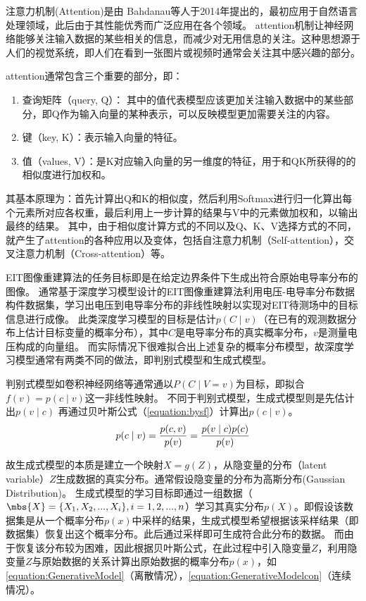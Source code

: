 注意力机制(Attention)是由 Bahdanau等人于2014年提出的\cite{2014Neural}，最初应用于自然语言处理领域，此后由于其性能优秀而广泛应用在各个领域。
attention机制让神经网络能够关注输入数据的某些相关的信息，而减少对无用信息的关注。这种思想源于人们的视觉系统，即人们在看到一张图片或视频时通常会关注其中感兴趣的部分。

attention通常包含三个重要的部分，即：
\begin{enumerate}
  \item 查询矩阵（query, Q）： 其中的值代表模型应该更加关注输入数据中的某些部分，即Q作为输入向量的某种表示，可以反映模型更加需要关注的内容。
  \item 键（key, K）：表示输入向量的特征。
  \item 值（values, V）：是K对应输入向量的另一维度的特征，用于和QK所获得的的相似度进行加权和。
\end{enumerate}

其基本原理为：首先计算出Q和K的相似度，然后利用Softmax进行归一化算出每个元素所对应各权重，最后利用上一步计算的结果与V中的元素做加权和，以输出最终的结果。
其中，由于相似度计算方式的不同以及Q、K、V选择方式的不同，就产生了attention的各种应用以及变体，包括自注意力机制（Self-attention），交叉注意力机制（Cross-attention）等。


EIT图像重建算法的任务目标即是在给定边界条件下生成出符合原始电导率分布的图像。
通常基于深度学习模型设计的EIT图像重建算法利用电压-电导率分布数据构件数据集，学习出电压到电导率分布的非线性映射以实现对EIT待测场中的目标信息进行成像。
此类深度学习模型的目标是估计$p(C \mid v)$（在已有的观测数据分布上估计目标变量的概率分布），其中$C$是电导率分布的真实概率分布，$v$是测量电压构成的向量组。
而实际情况下很难拟合出上述复杂的概率分布模型，故深度学习模型通常有两类不同的做法，即判别式模型和生成式模型。

判别式模型如卷积神经网络等通常通以$P(C \mid V=v)$为目标，即拟合$f(v) = p(c \mid v)$这一非线性映射。
不同于判别式模型，生成式模型则是先估计出$p(v \mid c)$ 再通过贝叶斯公式（\cref{equation:bysf}）计算出$p(c \mid v)$。
\begin{equation}
  \centering
  \label{equation:bysf}
  p(c \mid v) = \frac{p(c, v)}{p(v)} = \frac{p(v \mid c)p(c)}{p(v)} 
\end{equation}

故生成式模型的本质是建立一个映射$X=g(Z)$，从隐变量的分布（latent variable）$Z$生成数据的真实分布。通常假设隐变量的分布为高斯分布(Gaussian Distribution)。
生成式模型的学习目标即通过一组数据（$\mbs{X} = \{X_1, X_2, ..., X_i\}, i = 1, 2, ..., n$）学习其真实分布$p(X)$。即假设该数据集是从一个概率分布$p(x)$中采样的结果，生成式模型希望根据该采样结果（即数据集）恢复出这个概率分布。此后通过采样即可生成符合此分布的数据。
而由于恢复该分布较为困难，因此根据贝叶斯公式，在此过程中引入隐变量$Z$，利用隐变量$Z$与原始数据的关系计算出原始数据的概率分布$p(x)$，如\cref{equation:GenerativeModel}（离散情况），\cref{equation:GenerativeModelcon}（连续情况）。

